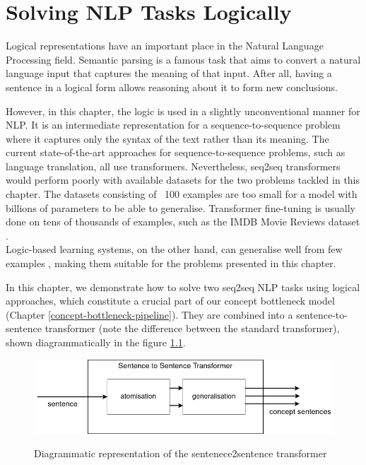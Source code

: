 


\chapter{Solving NLP Tasks Logically}
\label{solving-nlp-tasks-logically}


Logical representations have an important place in the Natural Language Processing field.
Semantic parsing \cite{RefWorks:RefID:28-jurafsky2014speech} is a famous task that aims to convert a natural language input that captures the meaning of that input.
After all, having a sentence in a logical form allows reasoning about it to form new conclusions.

However, in this chapter, the logic is used in a slightly unconventional manner for NLP.
It is an intermediate representation for a sequence-to-sequence problem where it captures only the syntax of the text rather than its meaning.
The current state-of-the-art approaches for sequence-to-sequence problems, such as language translation, all use transformers. 
Nevertheless, seq2seq transformers would perform poorly with available datasets for the two problems tackled in this chapter.
The datasets consisting of ~100 examples are too small for a model with billions of parameters to be able to generalise.
Transformer fine-tuning is usually done on tens of thousands of examples, such as the IMDB Movie Reviews dataset \cite{RefWorks:RefID:65-maas2011learning}. \\
Logic-based learning systems, on the other hand, can generalise well from few examples \cite{notes-lbl}, making them suitable for the problems presented in this chapter. 

In this chapter, we demonstrate how to solve two seq2seq NLP tasks using logical approaches, which constitute a crucial part of our concept bottleneck model (Chapter \ref{concept-bottleneck-pipeline}).
They are combined into a sentence-to-sentence transformer (note the difference between the standard transformer), shown diagrammatically in the figure \ref{sentence2sentence-transformer}.

\begin{figure}[h]
\caption{Diagrammatic representation of the sentenece2sentence transformer}
\vspace{10pt}
\centering
\includegraphics[width=\textwidth]{solving-nlp-tasks-logically/sent2sent_transformer.png}
\label{sentence2sentence-transformer}
\end{figure}



